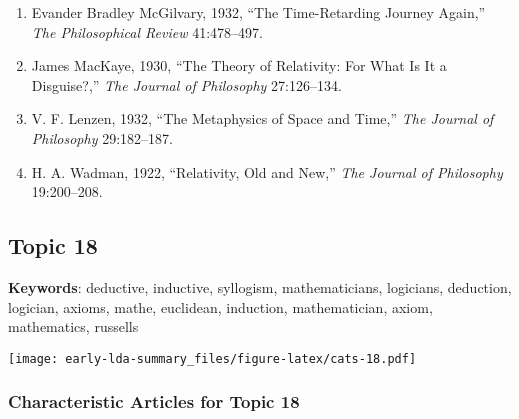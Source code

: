 \documentclass[
]{article}
\begin{document}
\begin{enumerate}
{  Philosophy} 26:337--345.
\item
  Evander Bradley McGilvary, 1932, ``The Time-Retarding Journey Again,''
  \emph{The Philosophical Review} 41:478--497.
\item
  James MacKaye, 1930, ``The Theory of Relativity: For What Is It a
  Disguise?,'' \emph{The Journal of Philosophy} 27:126--134.
\item
  V. F. Lenzen, 1932, ``The Metaphysics of Space and Time,'' \emph{The
  Journal of Philosophy} 29:182--187.
\item
  H. A. Wadman, 1922, ``Relativity, Old and New,'' \emph{The Journal of
  Philosophy} 19:200--208.
\end{enumerate}

\newpage

\hypertarget{topic-18}{%
\subsection{Topic 18}\label{topic-18}}

\textbf{Keywords}: deductive, inductive, syllogism, mathematicians,
logicians, deduction, logician, axioms, mathe, euclidean, induction,
mathematician, axiom, mathematics, russells

\texttt{[image: early-lda-summary\_files/figure-latex/cats-18.pdf]}
\newpage 

\hypertarget{characteristic-articles-for-topic-18}{%
\subsubsection{Characteristic Articles for Topic
18}\label{characteristic-articles-for-topic-18}}
\end{document}
